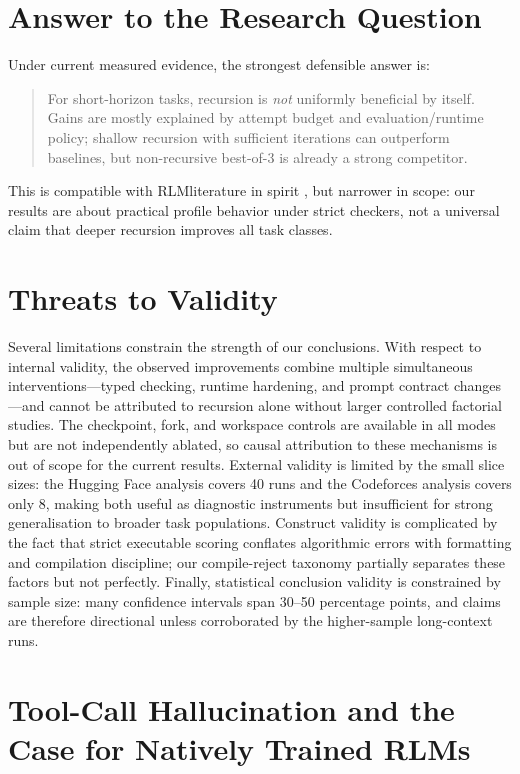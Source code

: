 \documentclass[11pt]{article}
\newcommand{\rlm}{RLM}
\begin{document}
\section{Answer to the Research Question}
Under current measured evidence, the strongest defensible answer is:

\begin{quote}
For short-horizon tasks, recursion is \emph{not} uniformly beneficial by itself. Gains are mostly explained by attempt budget and evaluation/runtime policy; shallow recursion with sufficient iterations can outperform baselines, but non-recursive best-of-3 is already a strong competitor.
\end{quote}

This is compatible with \rlm literature in spirit \cite{zhang2025rlm,primeintellect2026rlm}, but narrower in scope: our results are about practical profile behavior under strict checkers, not a universal claim that deeper recursion improves all task classes.

\section{Threats to Validity}
Several limitations constrain the strength of our conclusions. With respect to internal validity, the observed improvements combine multiple simultaneous interventions---typed checking, runtime hardening, and prompt contract changes---and cannot be attributed to recursion alone without larger controlled factorial studies. The checkpoint, fork, and workspace controls are available in all modes but are not independently ablated, so causal attribution to these mechanisms is out of scope for the current results. External validity is limited by the small slice sizes: the Hugging Face analysis covers 40 runs and the Codeforces analysis covers only 8, making both useful as diagnostic instruments but insufficient for strong generalisation to broader task populations. Construct validity is complicated by the fact that strict executable scoring conflates algorithmic errors with formatting and compilation discipline; our compile-reject taxonomy partially separates these factors but not perfectly. Finally, statistical conclusion validity is constrained by sample size: many confidence intervals span 30--50 percentage points, and claims are therefore directional unless corroborated by the higher-sample long-context runs.

\section{Tool-Call Hallucination and the Case for Natively Trained RLMs}
\end{document}
